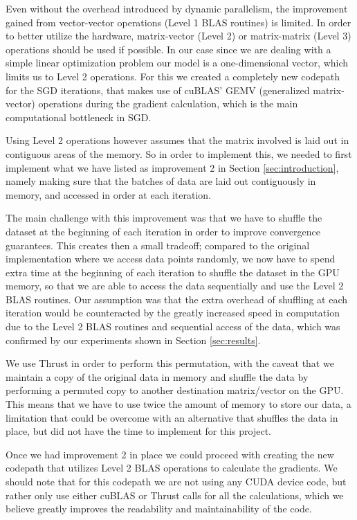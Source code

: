\documentclass[11pt,a4paper]{article}
\begin{document}
Even without the overhead introduced by dynamic parallelism, the improvement gained from vector-vector operations
(Level 1 BLAS routines) is limited. In order to better utilize the hardware, matrix-vector (Level 2) or matrix-matrix
(Level 3) operations should be used if possible. In our case since we are dealing with a simple linear
optimization problem our model is a one-dimensional vector, which limits us to Level 2 operations.
For this we created a completely new codepath for the SGD iterations, that makes use of cuBLAS' GEMV 
(generalized matrix-vector) operations
during the gradient calculation, which is the main computational bottleneck in SGD.

Using Level 2 operations however assumes that the matrix involved is laid out in contiguous areas of the 
memory. So in order to implement this, we needed to first implement what we have listed as improvement
2 in Section \ref{sec:introduction}, namely making sure that the batches of data are laid out contiguously
in memory, and accessed in order at each iteration.

The main challenge with this improvement was that we have to shuffle the dataset at the beginning
of each iteration in order to improve convergence guarantees. This creates then a small tradeoff; compared
to the original implementation where we access data points randomly, we now have to spend extra time at the beginning of 
each iteration to shuffle the dataset in the GPU memory, so that we are able to access the data sequentially and
use the Level 2 BLAS routines. Our assumption was that the extra overhead of shuffling at each iteration would
be counteracted by the greatly increased speed in computation due to the Level 2 BLAS routines and sequential
access of the data, which was confirmed by our experiments shown in Section \ref{sec:results}. 

We use Thrust in order to perform this permutation, with the caveat that we maintain a copy of the original 
data in memory and shuffle the data by performing a permuted copy to another destination matrix/vector on the GPU.
This means that we have to use twice the amount of memory to store our data, a limitation that could be overcome
with an alternative that shuffles the data in place, but did not have the time to implement for this project.

Once we had improvement 2 in place we could proceed with creating the new codepath that utilizes
Level 2 BLAS operations to calculate the gradients. We should note that for this codepath we are not
using any CUDA device code, but rather only use either cuBLAS or Thrust calls for all the calculations, 
which we believe greatly improves the readability and maintainability of the code.
\end{document}
